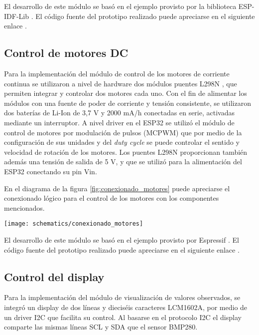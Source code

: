 El desarrollo de este módulo se basó en el ejemplo provisto por la biblioteca ESP-IDF-Lib \cite{ESP32_bmp280_example}. El código fuente del prototipo realizado puede apreciarse en el siguiente enlace \cite{ESP32_POC_bmp280}.


\subsection{Control de motores DC}

Para la implementación del módulo de control de los motores de corriente continua se utilizaron a nivel de hardware dos módulos puentes L298N \cite{L298N}, que permiten integrar y controlar dos motores cada uno. Con el fin de alimentar los módulos con una fuente de poder de corriente y tensión consistente, se utilizaron dos baterías de Li-Ion de 3,7 V y 2000 mA/h conectadas en serie, activadas mediante un interruptor.
A nivel driver en el ESP32 se utilizó el módulo de control de motores por modulación de pulsos (MCPWM) \cite{ESP32_MCPWM} que por medio de la configuración de sus unidades y del \textit{duty cycle} \cite{ESP32_MCPWM_2} se puede controlar el sentido y velocidad de rotación de los motores.
Los puentes L298N proporcionan también además una tensión de salida de 5 V, y que se utilizó para la alimentación del ESP32 conectando su pin Vin.

En el diagrama de la figura \ref{fig:conexionado_motores} puede apreciarse el conexionado lógico para el control de los motores con los componentes mencionados.

\begin{center}
\texttt{[image: schematics/conexionado\_motores]}
  \label{fig:conexionado_motores}
\end{center}

El desarrollo de este módulo se basó en el ejemplo provisto por Espressif \cite{ESP32_MCPWM_example}. El código fuente del prototipo realizado puede apreciarse en el siguiente enlace \cite{ESP32_POC_motor_MCPWM}.



\subsection{Control del display}

Para la implementación del módulo de visualización de valores observados, se integró un display de dos líneas y dieciséis caracteres LCM1602A, por medio de un driver I2C que facilita su control. Al basarse en el protocolo I2C el display comparte las mismas líneas SCL y SDA que el sensor BMP280.

